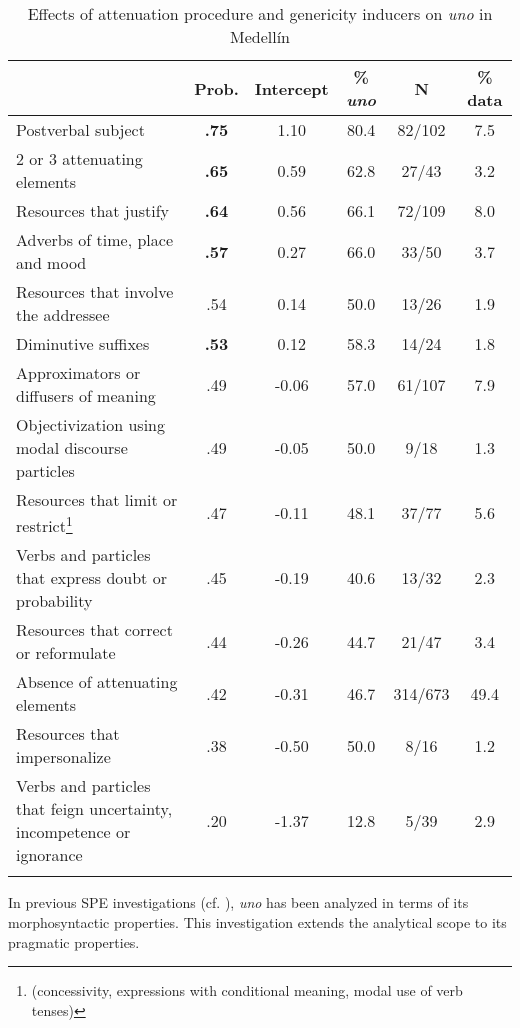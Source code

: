 \documentclass[output=paper]{langscibook}
\begin{document}
\begin{sidewaystable}
\begin{tabular}{>{\raggedright}p{9cm} S[table-format=1.2] S[table-format=-1.2] S[table-format=2.1] c S[table-format=2.1]}
\lsptoprule
{} & {Prob.} & {Intercept} & {\% \textit{uno}} & {N} & {\% data}\\
\midrule
Postverbal subject  & \bfseries .75 & 1.10 & 80.4 & 82/102 & 7.5\\
2 or 3 attenuating elements & \bfseries .65 & 0.59 & 62.8 & 27/43 & 3.2\\
Resources that justify  & \bfseries .64 & 0.56 & 66.1 & 72/109 & 8.0\\
Adverbs of time, place and mood & \bfseries .57 & 0.27 & 66.0 & 33/50 & 3.7\\
Resources that involve the addressee & .54 & 0.14 & 50.0 & 13/26 & 1.9\\
Diminutive suffixes & \bfseries .53 & 0.12 & 58.3 & 14/24 & 1.8\\
Approximators or diffusers of meaning & .49 & -0.06 & 57.0 & 61/107 & 7.9\\
Objectivization using modal discourse particles& .49 & -0.05 & 50.0 & 9/18 & 1.3\\
Resources that limit or restrict\footnote{(concessivity, expressions with conditional meaning, modal use of verb tenses)}  & .47 & -0.11 & 48.1 & 37/77 & 5.6\\
Verbs and particles that express doubt or probability& .45 & -0.19 & 40.6 & 13/32 & 2.3\\
Resources that correct or reformulate & .44 & -0.26 & 44.7 & 21/47 & 3.4\\
Absence of attenuating elements & .42 & -0.31 & 46.7 & 314/673 & 49.4\\
Resources that impersonalize & .38 & -0.50 & 50.0 & 8/16 & 1.2\\
Verbs and particles that feign uncertainty, incompetence or ignorance & .20 & -1.37 & 12.8 & 5/39 & 2.9\\
\lspbottomrule
\end{tabular}
\caption{Effects of attenuation procedure and genericity inducers on \textit{uno} in Medellín}
\label{tab:orozco:9}
\end{sidewaystable}

In previous SPE investigations (cf. \citealt{Flores-Ferrán2009}), \textit{uno} has been analyzed in terms of its morphosyntactic properties. This investigation extends the analytical scope to its pragmatic properties. 
\end{document}
